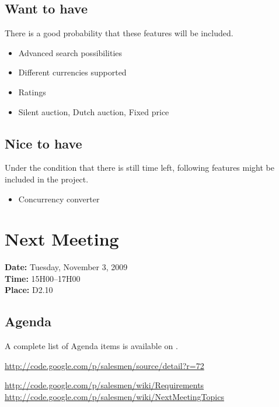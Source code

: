 \documentclass[a4paper, 12pt]{article}
\begin{document}
		\subsection{Want to have}
There is a good probability that these features will be included.
			\begin{itemize}
				\item Advanced search possibilities
				\item Different currencies supported
				\item Ratings
				\item Silent auction, Dutch auction, Fixed price 
			\end{itemize}
		
		\subsection{Nice to have}
Under the condition that there is still time left, following features might be included in the project.
			\begin{itemize}
				\item Concurrency converter
			\end{itemize}
		
	\section{Next Meeting}

		\textbf{Date:} Tuesday, November 3, 2009\\
		\textbf{Time:} 15H00--17H00\\
		\textbf{Place:} D2.10\\
	
		\subsection{Agenda}
A complete list of Agenda items is available on \cite{site3}.
	
	\begin{thebibliography}{99}
	
		\href{http://code.google.com/p/salesmen/source/detail?r=72}{http://code.google.com/p/salesmen/source/detail?r=72}
		
		\href{http://code.google.com/p/salesmen/wiki/Requirements}{http://code.google.com/p/salesmen/wiki/Requirements}
		\href{http://code.google.com/p/salesmen/wiki/NextMeetingTopics}{http://code.google.com/p/salesmen/wiki/NextMeetingTopics}
		

		

		
	\end{thebibliography}	
		
\end{document}
